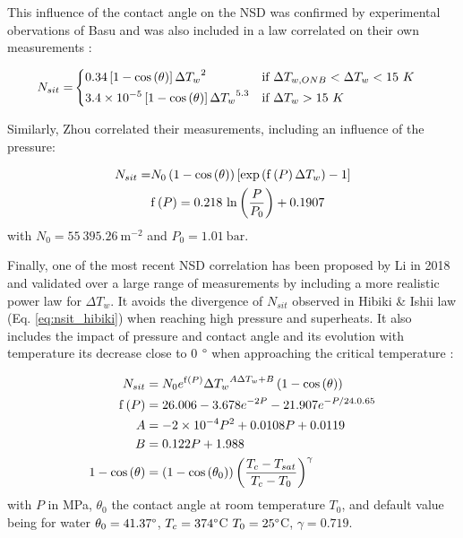 This influence of the contact angle on the NSD was confirmed by experimental obervations of Basu \etal \cite{basu_wall_2005} and was also included in a law correlated on their own measurements :

\begin{align}
N_{sit}=&
\begin{dcases}
0.34\left[ 1-\mathrm{cos}\left( \theta \right) \right] {\Delta T_{w}}^{2} & \text{if } \Delta T_{w,ONB}<\Delta T_{w} < 15\ K\\
3.4\times 10^{-5}\left[ 1-\mathrm{cos}\left( \theta \right) \right] {\Delta T_{w}}^{5.3} & \text{if } \Delta T_{w} > 15\ K
\end{dcases}
\label{eq:nsit_basu}
\end{align}

\npar

Similarly, Zhou \etal \cite{zhou_experimental_2020} correlated their measurements, including an influence of the pressure:

\begin{align}
N_{sit} =& N_{0}\left( 1-\mathrm{cos}\left( \theta \right) \right)\left[ \mathrm{exp}\left( \mathrm{f}\left( P \right) \Delta T_{w}  \right) -1  \right]
\label{eq:nsit_zhou}\\
&\mathrm{f}\left( P \right) = 0.218~\mathrm{ln}\left( \dfrac{P}{P_{0}} \right)+0.1907
\end{align}
with $N_{0}=55~395.26\ \mathrm{m}^{-2}$ and $P_{0}=1.01\ \mathrm{bar}$.

\npar

Finally, one of the most recent NSD correlation has been proposed by Li \etal in 2018 \cite{li_development_2018} and validated over a large range of measurements by including a more realistic power law for $\Delta T_{w}$. It avoids the divergence of $N_{sit}$ observed in Hibiki \& Ishii law (Eq. \ref{eq:nsit_hibiki}) when reaching high pressure and superheats. It also includes the impact of pressure and contact angle and its evolution with temperature \eg its decrease close to 0 $\degree$ when approaching the critical temperature \cite{song_temperature_2021}:


\begin{align}
N_{sit} &= N_{0}e^{\mathrm{f}\parth{P}} {\Delta T_{w}}^{A\Delta T_{w} + B} \parth{1- \cos{\theta}}
\label{eq:nsit_li}\\
%
\mathrm{f}\parth{P} &= 26.006 - 3.678 e^{-2P} - 21.907e^{-P / 24.0.65}\\
%
A &= -2\times 10^{-4} P^{2} + 0.0108P + 0.0119\\
%
B &= 0.122P +1.988\\
%
1-\cos{\theta} &= \parth{1-\cos{\theta_{0}}}\parth{\frac{T_{c}-T_{sat}}{T_{c}-T_{0}}}^{\gamma}
\end{align}
with $P$ in MPa, $\theta_{0}$ the contact angle at room temperature $T_{0}$, and default value being for water $\theta_{0}=41.37 \degree$, $T_{c}=374 \degree$C $T_{0}=25\degree$C, $\gamma = 0.719$.

